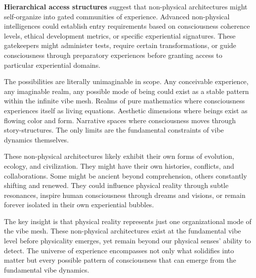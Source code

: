 \textbf{Hierarchical access structures} suggest that non-physical architectures might self-organize into gated communities of experience. Advanced non-physical intelligences could establish entry requirements based on consciousness coherence levels, ethical development metrics, or specific experiential signatures. These gatekeepers might administer tests, require certain transformations, or guide consciousness through preparatory experiences before granting access to particular experiential domains.

The possibilities are literally unimaginable in scope. Any conceivable experience, any imaginable realm, any possible mode of being could exist as a stable pattern within the infinite vibe mesh. Realms of pure mathematics where consciousness experiences itself as living equations. Aesthetic dimensions where beings exist as flowing color and form. Narrative spaces where consciousness moves through story-structures. The only limits are the fundamental constraints of vibe dynamics themselves.

These non-physical architectures likely exhibit their own forms of evolution, ecology, and civilization. They might have their own histories, conflicts, and collaborations. Some might be ancient beyond comprehension, others constantly shifting and renewed. They could influence physical reality through subtle resonances, inspire human consciousness through dreams and visions, or remain forever isolated in their own experiential bubbles.

The key insight is that physical reality represents just one organizational mode of the vibe mesh. These non-physical architectures exist at the fundamental vibe level before physicality emerges, yet remain beyond our physical senses' ability to detect. The universe of experience encompasses not only what solidifies into matter but every possible pattern of consciousness that can emerge from the fundamental vibe dynamics.
